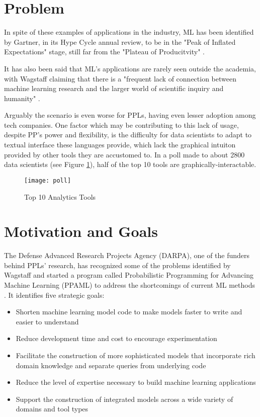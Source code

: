 \section{Problem} \label{sec:proj}

In spite of these examples of applications in the industry, ML has been
identified by Gartner, in its Hype Cycle annual review,
to be in the "Peak of Inflated Expectations" stage, still far
from the "Plateau of Producitvity" \cite{gartner}.

It has also been said that ML's applications are rarely seen
outside the academia, with Wagstaff claiming that there is a "frequent lack of
connection between machine learning research and the larger world of scientific
inquiry and humanity" \cite{Wagstaff2012}.

Arguably the scenario is even worse for PPLs, having even lesser adoption
among tech companies. One factor which may be contributing to this lack of
usage, despite PP's power and flexibility, is the difficulty for data scientists
to adapt to textual interface these languages provide, which lack the graphical
intuiton provided by other tools they are accustomed to. In a poll made to about 2800
data scientists (see Figure \ref{fig:poll}), half of the top 10 tools are
graphically-interactable.

\begin{figure}[t]
  \begin{center}
    \leavevmode
    \texttt{[image: poll]}
    \caption{Top 10 Analytics Tools \cite{kdn}}
    \label{fig:poll}
  \end{center}
\end{figure}

\section{Motivation and Goals} \label{sec:goals}

The Defense Advanced Research Projects Agency (DARPA), one of the funders behind
PPLs' research, has recognized some of the problems
identified by Wagstaff and started a program called Probabilistic Programming
for Advancing Machine Learning (PPAML) to address the shortcomings of
current ML methods \cite{darpa}. It identifies five strategic goals:

\begin{itemize}
  \item Shorten machine learning model code to make models faster to write and
  easier to understand
  \item Reduce development time and cost to encourage experimentation
  \item Facilitate the construction of more sophisticated models that
  incorporate rich domain knowledge and separate queries from underlying code
  \item Reduce the level of expertise necessary to build machine learning
  applications
  \item Support the construction of integrated models across a wide variety of
  domains and tool types
\end{itemize}

